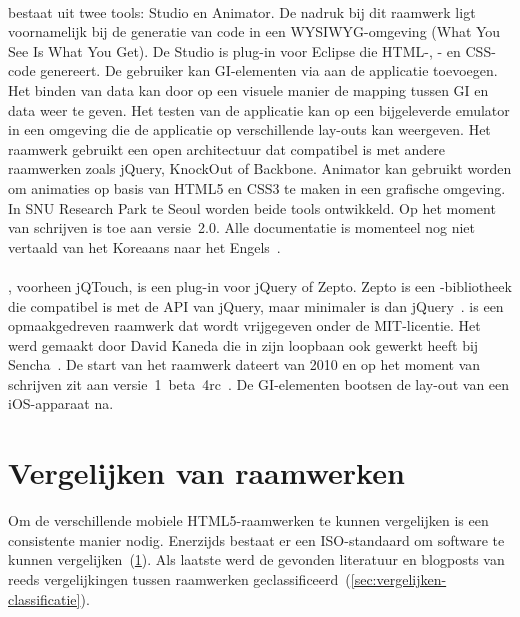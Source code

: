 \paragraph{\davinci}%
\davinci{} bestaat uit twee tools:  \davinci{} Studio en \davinci{} Animator.
De nadruk bij dit raamwerk ligt voornamelijk bij de generatie van code in een WYSIWYG-omgeving (What You See Is What You Get).
De \davinci{} Studio is plug-in voor Eclipse die HTML-,  \js{}- en CSS-code genereert.
De gebruiker kan GI-elementen via  aan de applicatie toevoegen.
Het binden van data kan door op een visuele manier de mapping tussen GI en data weer te geven.
Het testen van de applicatie kan op een bijgeleverde emulator in een  omgeving die de applicatie op verschillende lay-outs kan weergeven.
Het raamwerk gebruikt een open architectuur dat compatibel is met andere  raamwerken zoals jQuery, KnockOut of Backbone.
\davinci{} Animator kan gebruikt worden om animaties op basis van HTML5 en CSS3 te maken in een grafische omgeving.
In SNU Research Park te Seoul worden beide tools ontwikkeld.
Op het moment van schrijven is \davinci{} toe aan versie~2.0.  
Alle documentatie is momenteel nog niet vertaald van het Koreaans naar het Engels~\cite{Incross}.

\paragraph{\jqt}%
\jqt{}, voorheen jQTouch, is een plug-in voor jQuery of Zepto.
Zepto is een \js{}-bibliotheek die compatibel is met de API van jQuery, maar minimaler is dan jQuery~\cite{Zepto2013}.
\jqt{} is een opmaakgedreven raamwerk dat wordt vrijgegeven onder de MIT-licentie.
Het werd gemaakt door David Kaneda die in zijn loopbaan ook gewerkt heeft bij Sencha~\cite{JQT2013,Kaneda2013}.
De start van het raamwerk dateert van 2010 en op het moment van schrijven zit \jqt{} aan versie~1~beta~4rc~\cite{JQTouch2010,JQT2013}.
De GI-elementen bootsen de lay-out van een iOS-apparaat na.

 


\section{Vergelijken van raamwerken} 
\label{sec:vergelijken-raamwerken}
Om de verschillende mobiele HTML5-raamwerken te kunnen vergelijken is een consistente manier nodig.
Enerzijds bestaat er een ISO-standaard om software te kunnen vergelijken~(\ref{sec:vergelijken-raamwerken}).
Als laatste werd de gevonden literatuur en blogposts van reeds vergelijkingen tussen raamwerken geclassificeerd~(\ref{sec:vergelijken-classificatie}).

